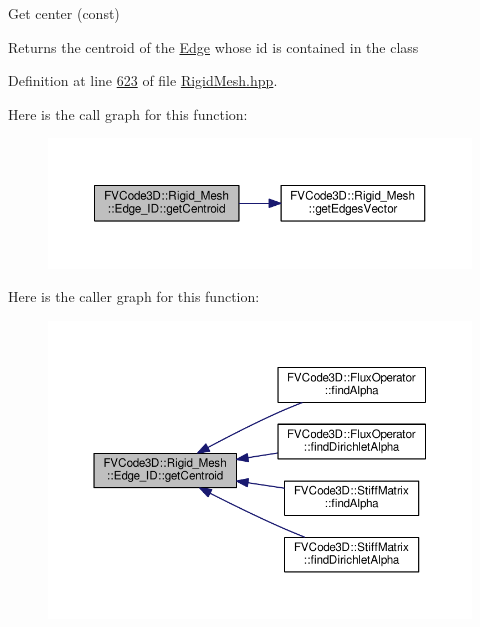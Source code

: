 Get center (const) 

\begin{DoxyReturn}{Returns}
the centroid of the \hyperlink{classFVCode3D_1_1Rigid__Mesh_1_1Edge}{Edge} whose id is contained in the class 
\end{DoxyReturn}


Definition at line \hyperlink{RigidMesh_8hpp_source_l00623}{623} of file \hyperlink{RigidMesh_8hpp_source}{Rigid\+Mesh.\+hpp}.



Here is the call graph for this function\+:
\nopagebreak
\begin{figure}[H]
\begin{center}
\leavevmode
\includegraphics[width=350pt]{classFVCode3D_1_1Rigid__Mesh_1_1Edge__ID_ab6f4cafa57b3e7116b815ee96aaf701c_cgraph}
\end{center}
\end{figure}




Here is the caller graph for this function\+:
\nopagebreak
\begin{figure}[H]
\begin{center}
\leavevmode
\includegraphics[width=350pt]{classFVCode3D_1_1Rigid__Mesh_1_1Edge__ID_ab6f4cafa57b3e7116b815ee96aaf701c_icgraph}
\end{center}
\end{figure}


